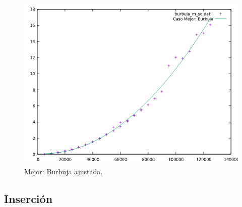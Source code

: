 \documentclass[a4paper,12pt,twoside]{article} %
\begin{document}
\begin{itemize}
\begin{figure}[h]
\begin{center}
  	\includegraphics[scale=0.8]{burbuja_m_so_a.png}
  	\caption{Mejor: Burbuja ajustada.}
  	
  \end{center}
\end{figure}
		
		\end{itemize}

\newpage

\subsection{Inserción}
\end{document}
